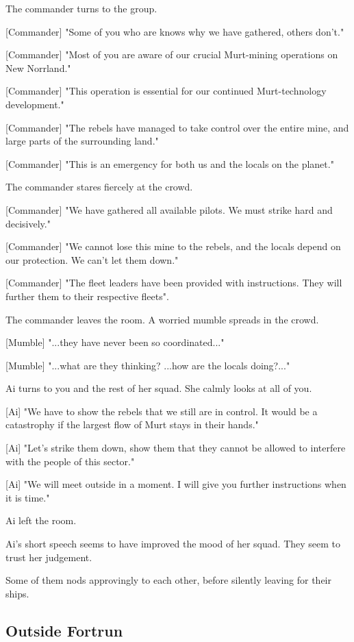 \documentclass[a4paper,12pt]{article}
\begin{document}
The commander turns to the group. 

[Commander] "Some of you who are knows why we have gathered,  others don't."

[Commander] "Most of you are aware of our crucial Murt-mining operations on New
Norrland." 

[Commander] "This operation is essential for our continued Murt-technology development."

[Commander] "The rebels have managed to take control over the entire mine, and large parts of the surrounding land." 

[Commander] "This is an emergency for both us and the locals on the planet."

The commander stares fiercely at the crowd. 

[Commander] "We have gathered all available pilots. We must strike hard and decisively."

[Commander] "We cannot lose this mine to the rebels, and the locals depend on our protection. We
can't let them down."

[Commander] "The fleet leaders have been provided with instructions. They will further them to
their respective fleets".

The commander leaves the room. A worried mumble spreads in the crowd.

[Mumble] "...they have never been so coordinated..."

[Mumble] "...what are they thinking? ...how are the locals doing?..."

Ai turns to you and the rest of her squad. She calmly looks at all of you.

[Ai] "We have to show the rebels that we still are in control. It would be a catastrophy if the largest flow of
Murt stays in their hands." 

[Ai] "Let's strike them down, show them that they cannot be allowed to interfere with the people of this sector."

[Ai] "We will meet outside in a moment. I will give you further instructions when it is time."

Ai left the room.

Ai's short speech seems to have improved the mood of her squad. They seem to trust her
judgement. 

Some of them nods approvingly to each other, before silently leaving for their ships.

\subsection{Outside Fortrun}
\end{document}
